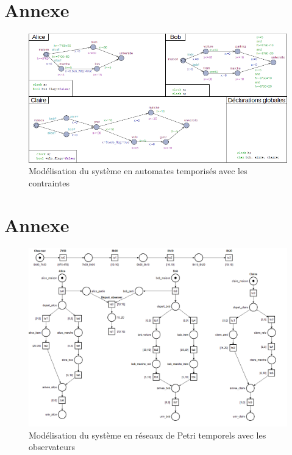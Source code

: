 \documentclass[11pt, a4paper]{article} %
\begin{document}

\nocite{*}



\clearpage


\newpage
\appendix
\setcounter{page}{1}
\renewcommand{\thepage}{\roman{page}}


\begin{landscape}

\section{Annexe}
\label{A}
   \begin{figure}[h]
    \begin{center}
      \includegraphics[scale=1]{captures/Automates.png}
      \caption{Modélisation du système en automates temporisés avec les contraintes}
    \end{center}
\end{figure}

\clearpage

\section{Annexe}
\label{B}
   \begin{figure}[h]
    \begin{center}
      \includegraphics[scale=0.62]{captures/petri1.PNG}
      \caption{Modélisation du système en réseaux de Petri temporels avec les observateurs}
    \end{center}
\end{figure}
      
\end{landscape}
\end{document}
